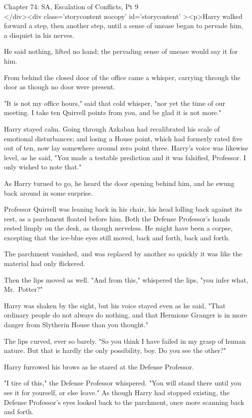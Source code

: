 
Chapter 74: SA, Escalation of Conflicts, Pt 9\\
</div><div  class='storycontent nocopy' id='storycontent' ><p>Harry walked 
forward a step, then another step, until a sense of unease began to pervade 
him, a disquiet in his nerves.

He said nothing, lifted no hand; the pervading sense of unease would say it for 
him.

From behind the closed door of the office came a whisper, carrying through the 
door as though no door were present.

"It is not my office hours," said that cold whisper, "nor yet the time of our 
meeting. I take ten Quirrell points from you, and be glad it is not more."

Harry stayed calm. Going through Azkaban had recalibrated his scale of 
emotional disturbances; and losing a House point, which had formerly rated five 
out of ten, now lay somewhere around zero point three. Harry's voice was 
likewise level, as he said, "You made a testable prediction and it was 
falsified, Professor. I only wished to note that."

As Harry turned to go, he heard the door opening behind him, and he swung back 
around in some surprise.

Professor Quirrell was leaning back in his chair, his head lolling back against 
its rest, as a parchment floated before him. Both the Defense Professor's hands 
rested limply on the desk, as though nerveless. He might have been a corpse, 
excepting that the ice-blue eyes still moved, back and forth, back and forth.

The parchment vanished, and was replaced by another so quickly it was like the 
material had only flickered.

Then the lips moved as well. "And from this," whispered the lips, "you infer 
what, Mr.~Potter?"

Harry was shaken by the sight, but his voice stayed even as he said, "That 
ordinary people do not always do nothing, and that Hermione Granger is in more 
danger from Slytherin House than you thought."

The lips curved, ever so barely. "So you think I have failed in my grasp of 
human nature. But that is hardly the only possibility, boy. Do you see the 
other?"

Harry furrowed his brows as he stared at the Defense Professor.

"I tire of this," the Defense Professor whispered. "You will stand there until 
you see it for yourself, or else leave." As though Harry had stopped existing, 
the Defense Professor's eyes looked back to the parchment, once more scanning 
back and forth.

